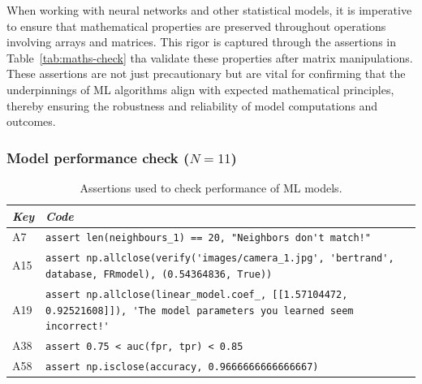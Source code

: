 When working with neural networks and other statistical models, it is imperative to ensure that mathematical properties are preserved throughout operations involving arrays and matrices. This rigor is captured through the assertions in Table~\ref{tab:maths-check} tha validate these properties after matrix manipulations. These assertions are not just precautionary but are vital for confirming that the underpinnings of ML algorithms align with expected mathematical principles, thereby ensuring the robustness and reliability of model computations and outcomes.


\subsubsection{Model performance check ($N = 11$)}\label{sec:assert-model-perf}

\begin{table}
  \centering
  \caption{Assertions used to check performance of ML models.}
  \begin{tabular}{@{}m{} m{}@{}}
    \toprule
    \emph{\textbf{Key}}&
    \emph{\textbf{Code}}\\
    \midrule

    A7 &
    \lstinline[]$assert len(neighbours_1) == 20, "Neighbors don't match!"$\\

    A15 &
    \lstinline[]$assert np.allclose(verify('images/camera_1.jpg', 'bertrand', database, FRmodel), (0.54364836, True))$\\

    A19 &
    \lstinline[]$assert np.allclose(linear_model.coef_, [[1.57104472, 0.92521608]]), 'The model parameters you learned seem incorrect!'$\\

    A38 &
    \lstinline[]$assert 0.75 < auc(fpr, tpr) < 0.85$\\

    A58 &
    \lstinline[]$assert np.isclose(accuracy, 0.9666666666666667)$\\
    \bottomrule
  \end{tabular}
  \label{tab:model-perf-explicit}
\end{table}


